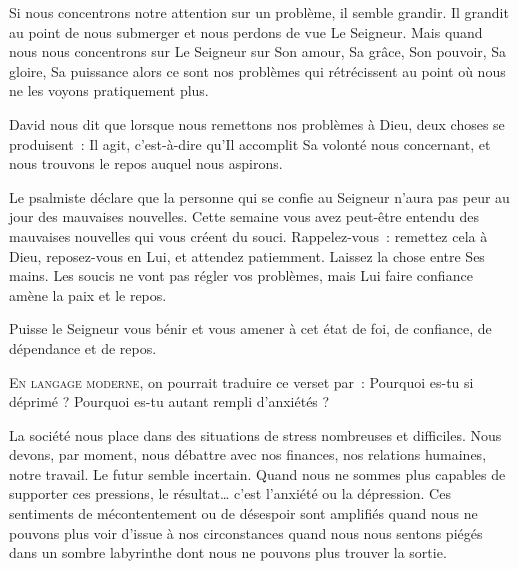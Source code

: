 Si nous concentrons notre attention sur un problème, il semble grandir.
 Il grandit au point de nous submerger et nous perdons de vue Le Seigneur.
 Mais quand nous nous concentrons sur Le Seigneur
 \ocadr sur Son amour, Sa grâce, Son pouvoir, Sa gloire, Sa puissance \fcadr{}
 alors ce sont nos problèmes qui rétrécissent au point
 où nous ne les voyons pratiquement plus. 


David nous dit que lorsque nous remettons nos problèmes à Dieu,
 deux choses se produisent~: Il agit, c'est-à-dire qu'Il accomplit
 Sa volonté nous concernant, et nous trouvons le repos auquel nous aspirons.

Le psalmiste déclare que la personne qui se confie au Seigneur
 n'aura pas peur au jour des mauvaises nouvelles.
 Cette semaine vous avez peut-être entendu des mauvaises nouvelles
 qui vous créent du souci. Rappelez-vous~: remettez cela à Dieu,
 reposez-vous en Lui, et attendez patiemment.
 Laissez la chose entre Ses mains.
 Les soucis ne vont pas régler vos problèmes,
 mais Lui faire confiance amène la paix et le repos. 

Puisse le Seigneur vous bénir et vous amener à cet état de foi,
 de confiance, de dépendance et de repos. 

\dvrule






\lettrine{E}{n langage moderne,} on pourrait traduire ce verset par~:
 \Og Pourquoi es-tu si déprimé ?
 Pourquoi es-tu autant rempli d'anxiétés ? \Fg{}

La société nous place dans des situations de stress nombreuses et difficiles.
 Nous devons, par moment, nous débattre avec nos finances,
 nos relations humaines, notre travail.
 Le futur semble incertain. Quand nous ne sommes plus capables
 de supporter ces pressions, le résultat\dots{}
 c'est l'anxiété ou la dépression.
 Ces sentiments de mécontentement ou de désespoir sont amplifiés
 quand nous ne pouvons plus voir d'issue à nos circonstances
 \ocadr quand nous nous sentons piégés dans un sombre labyrinthe
 dont nous ne pouvons plus trouver la sortie. 

